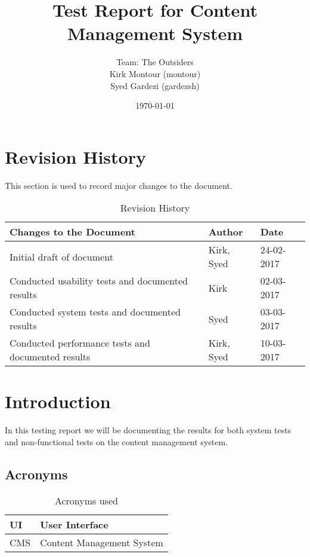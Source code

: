 \documentclass[12pt]{article}
\begin{document}
\title{Test Report for Content Management System} 
\author{Team: The Outsiders\\ Kirk Montour (montour)\\ Syed Gardezi (gardezsh)}
\date{\today}
  
\maketitle



\pagebreak

\tableofcontents

\pagebreak

\section{Revision History}
This section is used to record major changes to the document.
\begin{table}[H]
\centering
\caption{Revision History}
\begin{tabular}{|l|l|l|}
\hline
\textbf{Changes to the Document}                          & \textbf{Author}     & \textbf{Date}       \\ \hline
Initial draft of document                        & Kirk, Syed & 24-02-2017 \\ \hline
Conducted usability tests and documented results & Kirk       & 02-03-2017 \\ \hline
Conducted system tests and documented results    & Syed       & 03-03-2017 \\ \hline
Conducted performance tests and documented results    & Kirk, Syed & 10-03-2017 \\ \hline
\end{tabular}
\end{table}

\listoftables

\section{Introduction}
In this testing report we will be documenting the results for both
system tests and non-functional tests on the content management system.

\subsection{Acronyms}

\begin{table}[h]
\centering
\caption{Acronyms used}
\label{my-label}
\begin{tabular}{|l|l|}
\hline
UI  & User Interface            \\ \hline
CMS & Content Management System \\ \hline
\end{tabular}
\end{table}
\end{document}
